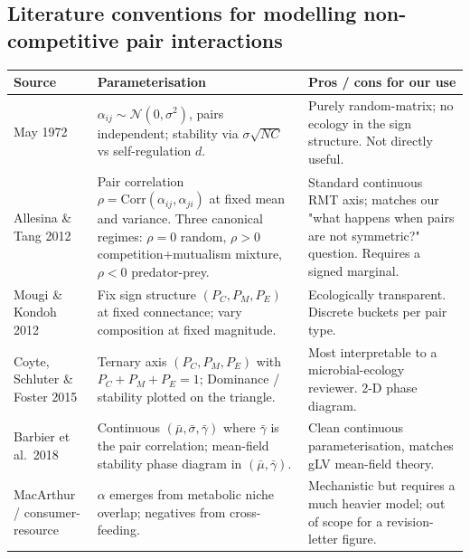 \documentclass[11pt]{article}
\begin{document}
\subsection*{Literature conventions for modelling non-competitive pair interactions}
\begin{center}
\small
\begin{tabular}{p{} p{} p{}}
\toprule
\textbf{Source} & \textbf{Parameterisation} & \textbf{Pros / cons for our use} \\
\midrule
May 1972 &
$\alpha_{ij} \sim \mathcal{N}(0, \sigma^2)$, pairs independent; stability via $\sigma\sqrt{NC}$ vs self-regulation $d$. &
Purely random-matrix; no ecology in the sign structure. Not directly useful. \\
Allesina \& Tang 2012 &
Pair correlation $\rho = \mathrm{Corr}(\alpha_{ij},\alpha_{ji})$ at fixed mean and variance. Three canonical regimes: $\rho=0$ random, $\rho>0$ competition+mutualism mixture, $\rho<0$ predator-prey. &
Standard continuous RMT axis; matches our "what happens when pairs are not symmetric?" question. Requires a signed marginal. \\
Mougi \& Kondoh 2012 &
Fix sign structure $(P_C, P_M, P_E)$ at fixed connectance; vary composition at fixed magnitude. &
Ecologically transparent. Discrete buckets per pair type. \\
Coyte, Schluter \& Foster 2015 &
Ternary axis $(P_C, P_M, P_E)$ with $P_C + P_M + P_E = 1$; Dominance / stability plotted on the triangle. &
Most interpretable to a microbial-ecology reviewer. 2-D phase diagram. \\
Barbier et al.\ 2018 &
Continuous $(\bar\mu, \bar\sigma, \bar\gamma)$ where $\bar\gamma$ is the pair correlation; mean-field stability phase diagram in $(\bar\mu, \bar\gamma)$. &
Clean continuous parameterisation, matches gLV mean-field theory. \\
MacArthur / consumer-resource &
$\alpha$ emerges from metabolic niche overlap; negatives from cross-feeding. &
Mechanistic but requires a much heavier model; out of scope for a revision-letter figure. \\
\bottomrule
\end{tabular}
\end{center}
\end{document}
